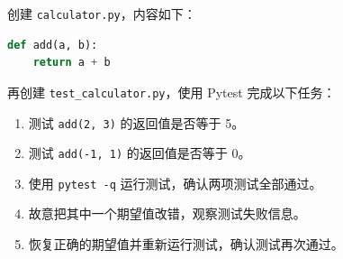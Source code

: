 \documentclass[a4paper,12pt]{report}
\begin{document}
创建 \texttt{calculator.py}，内容如下：

\begin{lstlisting}[language=Python]
def add(a, b):
    return a + b
\end{lstlisting}

再创建 \texttt{test\_calculator.py}，使用 Pytest 完成以下任务：

\begin{enumerate}
  \item 测试 \texttt{add(2, 3)} 的返回值是否等于 5。
  \item 测试 \texttt{add(-1, 1)} 的返回值是否等于 0。
  \item 使用 \texttt{pytest -q} 运行测试，确认两项测试全部通过。
  \item 故意把其中一个期望值改错，观察测试失败信息。
  \item 恢复正确的期望值并重新运行测试，确认测试再次通过。
\end{enumerate}

\end{document}
